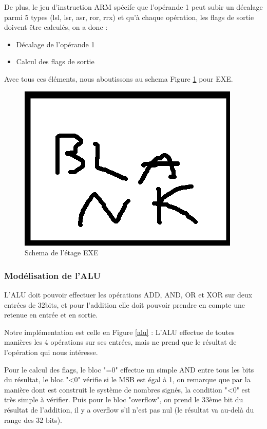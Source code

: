 \documentclass{article}
\begin{document}
De plus, le jeu d'instruction ARM spécife que l'opérande 1 peut subir un décalage
parmi 5 types (lsl, lsr, asr, ror, rrx) et qu'à chaque opération, les flags de sortie
doivent être calculés, on a donc :
\begin{itemize}
  \item Décalage de l'opérande 1
  \item Calcul des flags de sortie
\end{itemize}

Avec tous ces éléments, nous aboutissons au schema Figure \ref{exe} pour EXE.

\begin{figure}[ht]
\includegraphics[scale=1]{pics/blank.png}
\centering
\caption{Schema de l'étage EXE}
\label{exe}
\end{figure}

\subsubsection{Modélisation de l'ALU}

L'ALU doit pouvoir effectuer les opérations ADD, AND, OR et XOR sur deux entrées de 32bits,
et pour l'addition elle doit pouvoir prendre en compte une retenue en entrée et en sortie.

Notre implémentation est celle en Figure \ref{alu} : L'ALU effectue de toutes manières les
4 opérations sur ses entrées, mais ne prend que le résultat de l'opération qui nous intéresse.

Pour le calcul des flags, le bloc "=0" effectue un simple AND entre tous les bits du résultat,
le bloc "<0" vérifie si le MSB est égal à 1, on remarque que par la manière dont est construit
le système de nombres signés, la condition "<0" est très simple à vérifier. Puis pour le bloc "overflow",
on prend le 33ème bit du résultat de l'addition, il y a overflow s'il n'est pas nul (le résultat va au-delà
du range des 32 bits).
\end{document}
